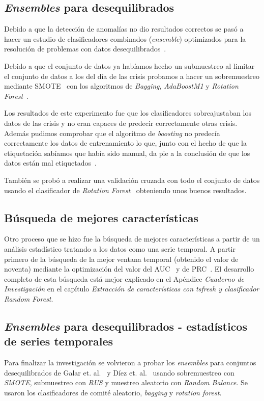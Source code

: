 \subsection{\textit{Ensembles} para desequilibrados}
Debido a que la detección de anomalías no dio resultados correctos se pasó a hacer un estudio de clasificadores combinados (\textit{ensemble}) optimizados para la resolución de problemas con datos desequilibrados~\cite{diez2015diversity,galar2012review}.

Debido a que el conjunto de datos ya habíamos hecho un submuestreo al limitar el conjunto de datos a los del día de las crisis probamos a hacer un sobremuestreo mediante SMOTE~\cite{galar2012review} con los algoritmos de \textit{Bagging}, \textit{AdaBoostM1} y \textit{Rotation Forest}~\cite{rodriguez2006rotation}.

Los resultados de este experimento fue que los clasificadores sobreajustaban los datos de las crisis y no eran capaces de predecir correctamente otras crisis. Además pudimos comprobar que el algoritmo de \textit{boosting} no predecía correctamente los datos de entrenamiento lo que, junto con el hecho de que la etiquetación sabíamos que había sido manual, da pie a la conclusión de que los datos están mal etiquetados~\cite{ubu:mineria3}.

También se probó a realizar una validación cruzada con todo el conjunto de datos usando el clasificador de \textit{Rotation Forest}~\cite{rodriguez2006rotation} obteniendo unos buenos resultados.

\subsection{Búsqueda de mejores características}
Otro proceso que se hizo fue la búsqueda de mejores características a partir de un análisis estadístico tratando a los datos como una serie temporal. A partir primero de la búsqueda de la mejor ventana temporal (obtenido el valor de noventa) mediante la optimización del valor del AUC~\cite{galar2012review} y de PRC~\cite{Davis2006RPR}. El desarrollo completo de esta búsqueda está mejor explicado en el Apéndice \textit{Cuaderno de Investigación} en el capítulo \textit{Extracción de características con tsfresh y clasificador Random Forest}.

\subsection{\textit{Ensembles} para desequilibrados - estadísticos de series temporales}
Para finalizar la investigación se volvieron a probar los \textit{ensembles} para conjuntos desequilibrados de Galar et. al.~\cite{galar2012review} y Díez et. al.~\cite{diez2015random, diez2015diversity} usando sobremuestreo con \textit{SMOTE}, submuestreo con \textit{RUS} y muestreo aleatorio con \textit{Random Balance}. Se usaron los clasificadores de comité aleatorio, \textit{bagging} y \textit{rotation forest}.

